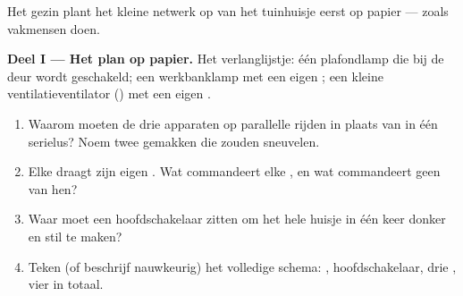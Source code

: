 \begin{problem}\label{pb:g6:circuits-and-safety:1}
Het gezin plant het kleine netwerk op  van het tuinhuisje
eerst op papier --- zoals vakmensen doen.

\medskip\noindent\textbf{Deel I --- Het plan op papier.}
Het verlanglijstje: één plafondlamp die bij de deur wordt geschakeld;
een werkbanklamp met een eigen ; een kleine
ventilatieventilator () met een eigen .
\begin{enumerate}
  \item Waarom moeten de drie apparaten op parallelle  rijden
        in plaats van in één serielus? Noem twee gemakken die
         zouden sneuvelen.
  \item Elke  draagt zijn eigen . Wat commandeert
        elke , en wat commandeert geen van hen?
  \item Waar moet een hoofdschakelaar zitten om het hele huisje in
        één keer donker en stil te maken?
  \item Teken (of beschrijf nauwkeurig) het volledige schema:
        , hoofdschakelaar, drie , vier
         in totaal.
\end{enumerate}


\end{problem}
